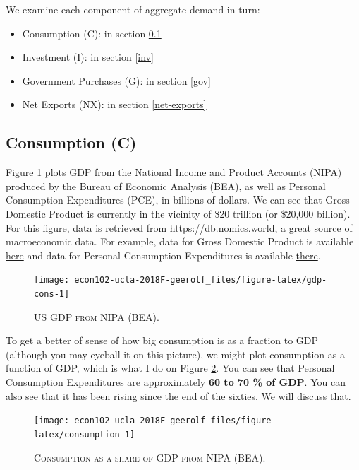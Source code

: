 \documentclass[]{book}
\providecommand{\tightlist}{%
  \setlength{\itemsep}{0pt}\setlength{\parskip}{0pt}}
\theoremstyle{definition}
\theoremstyle{definition}
\theoremstyle{definition}
\theoremstyle{remark}
\begin{document}
We examine each component of aggregate demand in turn:

\begin{itemize}
\tightlist
\item
  Consumption (C): in section \ref{cons}
\item
  Investment (I): in section \ref{inv}
\item
  Government Purchases (G): in section \ref{gov}
\item
  Net Exports (NX): in section \ref{net-exports}
\end{itemize}

\subsection{Consumption (C)}\label{cons}

Figure \ref{fig:gdp-cons} plots GDP from the National Income and Product
Accounts (NIPA) produced by the Bureau of Economic Analysis (BEA), as
well as Personal Consumption Expenditures (PCE), in billions of dollars.
We can see that Gross Domestic Product is currently in the vicinity of
\$20 trillion (or \$20,000 billion). For this figure, data is retrieved
from \url{https://db.nomics.world}, a great source of macroeconomic
data. For example, data for Gross Domestic Product is available
\href{https://db.nomics.world/BEA/NIPA-T10105/A191RC-Q}{here} and data
for Personal Consumption Expenditures is available
\href{https://db.nomics.world/BEA/NIPA-T10105/DPCERC-Q}{there}.



\begin{figure}

{\centering \texttt{[image: econ102-ucla-2018F-geerolf\_files/figure-latex/gdp-cons-1]} 

}

\caption{\textsc{US GDP from NIPA (BEA)}.}\label{fig:gdp-cons}
\end{figure}

To get a better of sense of how big consumption is as a fraction to GDP
(although you may eyeball it on this picture), we might plot consumption
as a function of GDP, which is what I do on Figure
\ref{fig:consumption}. You can see that Personal Consumption
Expenditures are approximately \textbf{60 to 70 \% of GDP}. You can also
see that it has been rising since the end of the sixties. We will
discuss that.




\begin{figure}

{\centering \texttt{[image: econ102-ucla-2018F-geerolf\_files/figure-latex/consumption-1]} 

}

\caption{\textsc{Consumption as a share of GDP from NIPA
(BEA)}.}\label{fig:consumption}
\end{figure}
\end{document}
